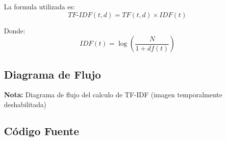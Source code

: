 \documentclass[12pt,a4paper]{article}
\begin{document}
La formula utilizada es:
\begin{equation}
TF\text{-}IDF(t,d) = TF(t,d) \times IDF(t)
\end{equation}

Donde:
\begin{equation}
IDF(t) = \log\left(\frac{N}{1 + df(t)}\right)
\end{equation}

\subsection{Diagrama de Flujo}


\textbf{Nota:} Diagrama de flujo del calculo de TF-IDF (imagen temporalmente deshabilitada)

\subsection{Código Fuente}
\end{document}
